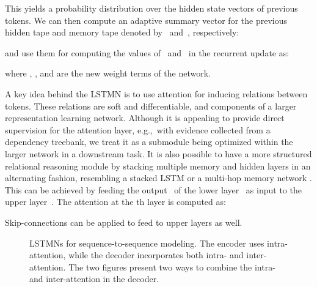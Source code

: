 \documentclass[11pt,letterpaper]{article}
\begin{document}
                        
                        This yields a probability distribution over the hidden state vectors of previous tokens.
                        We can then compute an adaptive summary vector for the previous hidden tape and memory tape
                        denoted by~ and~, respectively:
                        
                        and use them for computing the
                        values of~ and~ in the recurrent update as:
	
	
	 
	where , ,  and  are the new weight terms of the network. 
	


	A key idea behind the LSTMN is to use attention for inducing
        relations between tokens.  These relations are soft and
        differentiable, and components of a larger representation
        learning network. Although it is appealing to provide direct
        supervision for the attention layer, e.g.,~with evidence
        collected from a dependency treebank, we treat it as a
        submodule being optimized within the larger network in a
        downstream task.  It is also possible to have a more
        structured relational reasoning module by stacking multiple
        memory and hidden layers in an alternating fashion, resembling
        a stacked LSTM \cite{graves2013generating} or a multi-hop
        memory network \cite{sukhbaatar2015end}.  This can be achieved
        by feeding the output~ of the lower layer~ as
        input to the upper layer~.  The attention at the
        th layer is computed as:
        
        Skip-connections \cite{graves2013generating} can be applied to feed
         to upper layers as well.

	\begin{figure*}[t]
		\begin{center}
			\label{shallow} \quad
			\label{deep}
		\end{center}
		\caption{LSTMNs for sequence-to-sequence modeling. The
                  encoder uses intra-attention, while the decoder
                  incorporates both intra- and inter-attention. The
                  two figures present two ways to combine the intra-
                  and inter-attention in the decoder. }
		\label{att}
		\vspace{-2.5ex}
	\end{figure*}
	
\end{document}
